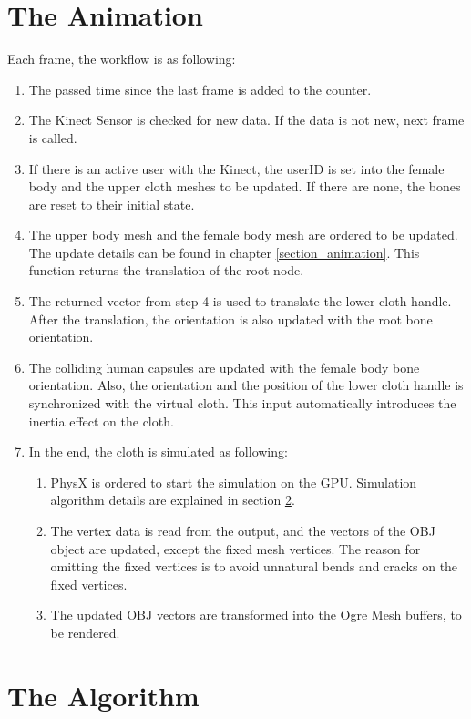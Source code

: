 \section{The Animation}
Each frame, the workflow is as following:
\begin{enumerate}
\item The passed time since the last frame is added to the counter.
\item The Kinect Sensor is checked for new data. If the data is not new, next frame is called. 
\item If there is an active user with the Kinect, the userID is set into the female body and the upper cloth meshes to be updated. If there are none, the bones are reset to their initial state.
\item The upper body mesh and the female body mesh are ordered to be updated. The update details can be found in chapter \ref{section_animation}. This function returns the translation of the root node. 
\item The returned vector from step 4 is used to translate the lower cloth handle. After the translation, the orientation is also updated with the root bone orientation.
\item The colliding human capsules are updated with the female body bone orientation. Also, the orientation and the position of the lower cloth handle is synchronized with the virtual cloth. This input automatically introduces the inertia effect on the cloth.
\item In the end, the cloth is simulated as following:
\begin{enumerate}
  \item PhysX is ordered to start the simulation on the GPU. Simulation algorithm details are explained in section \ref{section_cloth_simulation_algorithm}.
  \item The vertex data is read from the output, and the vectors of the OBJ object are updated, except the fixed mesh vertices. The reason for omitting the fixed vertices is to avoid unnatural bends and cracks on the fixed vertices.
  \item The updated OBJ vectors are transformed into the Ogre Mesh buffers, to be rendered. 
\end{enumerate}
\end{enumerate}

\section{The Algorithm}
\label{section_cloth_simulation_algorithm}

